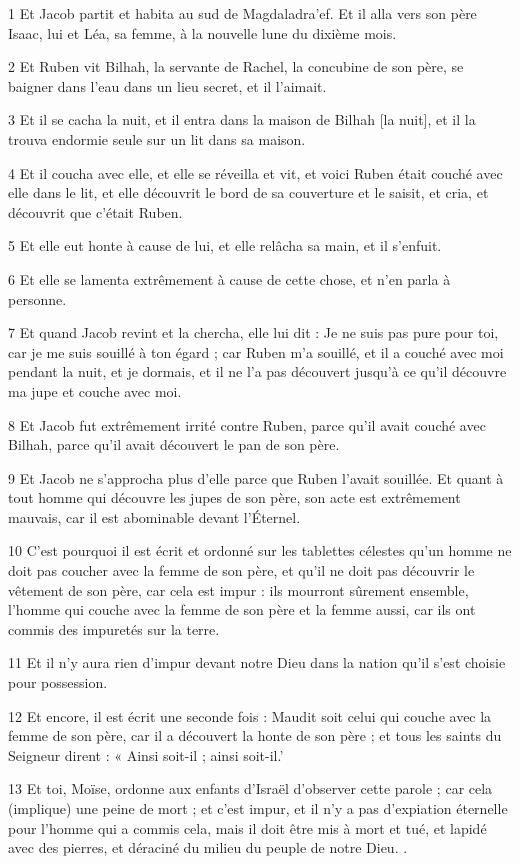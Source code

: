 \par 1 Et Jacob partit et habita au sud de Magdaladra'ef. Et il alla vers son père Isaac, lui et Léa, sa femme, à la nouvelle lune du dixième mois.
\par 2 Et Ruben vit Bilhah, la servante de Rachel, la concubine de son père, se baigner dans l'eau dans un lieu secret, et il l'aimait.
\par 3 Et il se cacha la nuit, et il entra dans la maison de Bilhah [la nuit], et il la trouva endormie seule sur un lit dans sa maison.
\par 4 Et il coucha avec elle, et elle se réveilla et vit, et voici Ruben était couché avec elle dans le lit, et elle découvrit le bord de sa couverture et le saisit, et cria, et découvrit que c'était Ruben.
\par 5 Et elle eut honte à cause de lui, et elle relâcha sa main, et il s'enfuit.
\par 6 Et elle se lamenta extrêmement à cause de cette chose, et n'en parla à personne.
\par 7 Et quand Jacob revint et la chercha, elle lui dit : Je ne suis pas pure pour toi, car je me suis souillé à ton égard ; car Ruben m'a souillé, et il a couché avec moi pendant la nuit, et je dormais, et il ne l'a pas découvert jusqu'à ce qu'il découvre ma jupe et couche avec moi.
\par 8 Et Jacob fut extrêmement irrité contre Ruben, parce qu'il avait couché avec Bilhah, parce qu'il avait découvert le pan de son père.
\par 9 Et Jacob ne s'approcha plus d'elle parce que Ruben l'avait souillée. Et quant à tout homme qui découvre les jupes de son père, son acte est extrêmement mauvais, car il est abominable devant l'Éternel.
\par 10 C'est pourquoi il est écrit et ordonné sur les tablettes célestes qu'un homme ne doit pas coucher avec la femme de son père, et qu'il ne doit pas découvrir le vêtement de son père, car cela est impur : ils mourront sûrement ensemble, l'homme qui couche avec la femme de son père et la femme aussi, car ils ont commis des impuretés sur la terre.
\par 11 Et il n'y aura rien d'impur devant notre Dieu dans la nation qu'il s'est choisie pour possession.
\par 12 Et encore, il est écrit une seconde fois : Maudit soit celui qui couche avec la femme de son père, car il a découvert la honte de son père ; et tous les saints du Seigneur dirent : « Ainsi soit-il ; ainsi soit-il.'
\par 13 Et toi, Moïse, ordonne aux enfants d'Israël d'observer cette parole ; car cela (implique) une peine de mort ; et c'est impur, et il n'y a pas d'expiation éternelle pour l'homme qui a commis cela, mais il doit être mis à mort et tué, et lapidé avec des pierres, et déraciné du milieu du peuple de notre Dieu. .
